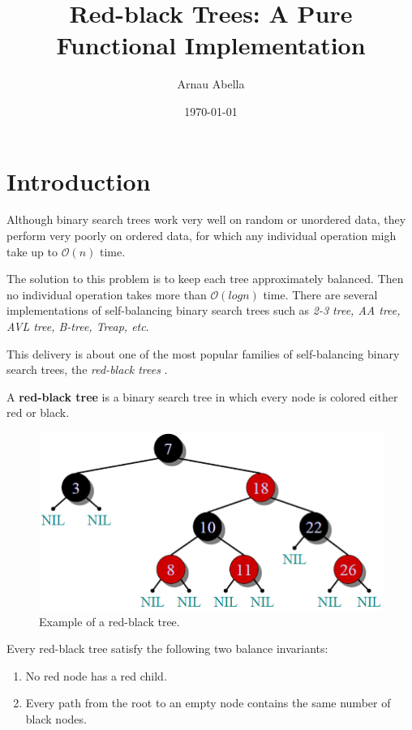 \documentclass[12pt, a4paper]{article} %
\title{Red-black Trees: A Pure Functional Implementation}
\author{Arnau Abella}
\date{\today}
\begin{document}
\maketitle

\section{Introduction}\label{s:introduction}

Although binary search trees work very well on random or unordered data, they perform very poorly on ordered data, for which any individual operation migh take up to $\mathcal{O}(n)$ time.

The solution to this problem is to keep each tree approximately balanced. Then no individual operation takes more than $\mathcal{O}(log n)$ time. There are several implementations of self-balancing binary search trees such as \textit{2-3 tree, AA tree, AVL tree, B-tree, Treap, etc}.

This delivery is about one of the most popular families of self-balancing binary search trees, the \textit{red-black trees} \cite{gs78}.

A \textbf{red-black tree} is a binary search tree in which every node is colored either red or black.

\begin{figure}[b]
  \includegraphics[scale=0.5]{rbt}
  \centering
  \caption{Example of a red-black tree.}
  \label{fig:rbt}
\end{figure}

Every red-black tree satisfy the following two balance invariants:

\begin{enumerate}
  \item No red node has a red child. \label{inv1}
  \item Every path from the root to an empty node contains the same number of black nodes. \label{inv2}
\end{enumerate}
\end{document}
